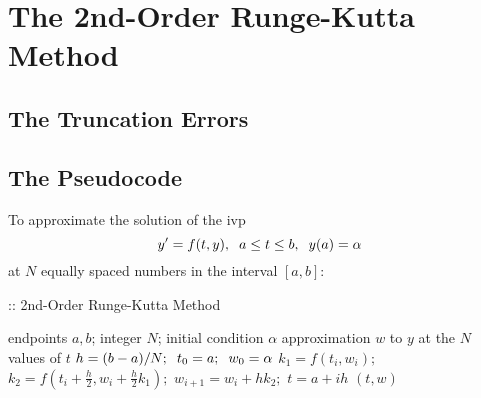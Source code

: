 \documentclass[12pt,oneside]{book}
\begin{document}
	\section{The 2nd-Order Runge-Kutta Method} \label{m:rk2}
		\begin{spacing}{1.2}
			
			
			
			\subsection*{The Truncation Errors}
			
			
			\subsection*{The Pseudocode}
				To approximate the solution of the \ac{ivp} 
				\[ y' = f(t,y), \hspace*{0.2cm} a \leq t \leq b, \hspace*{0.2cm} y(a) = \alpha \]
				at $ N $ equally spaced numbers in the interval $ [a, b]: $
				
				\begin{algorithm}[H]
					\caption{:: 2nd-Order Runge-Kutta Method}
					\begin{algorithmic}[1]
						\REQUIRE endpoints $ a, b $; \hspace*{0.2cm} integer $ N $; \hspace*{0.2cm} initial condition $ \alpha $
						\ENSURE approximation $ w $ to $ y $ at the $ N $ values of $ t $
						\STATE $ h = (b - a) / N; \hspace*{0.2cm} t_0 = a; \hspace*{0.2cm} w_{0} = \alpha $
							\STATE $ k_{1} = f(t_{i},w_{i}); $ \hspace*{0.5cm} 
							\STATE $ k_{2} = f\left(t_{i} + \frac{h}{2}, w_{i} + \frac{h}{2}k_{1}\right); $ \hspace*{0.5cm} 
							\STATE $ w_{i+1} = w_{i} + hk_{2}; $ \hspace*{0.5cm} 
							\STATE $ t = a + ih $ \hspace*{0.5cm} 
						\ENDFOR
						\RETURN $ (t, w) $
					\end{algorithmic}
				\end{algorithm}
			
		\end{spacing}
		
\end{document}
